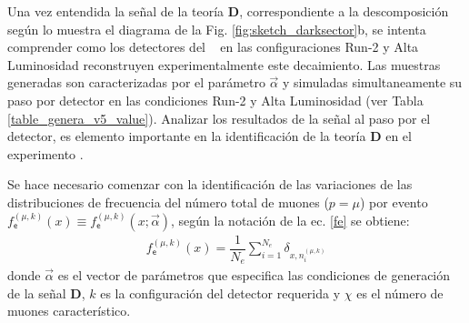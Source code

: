 
Una vez entendida la señal de la teoría \MSSM\textbf{D}, correspondiente a la descomposición según lo muestra el diagrama de la Fig. \ref{fig:sketch_darksector}b, se intenta comprender como los detectores del \CMS ~ en las configuraciones Run-2 y Alta Luminosidad reconstruyen experimentalmente este decaimiento. Las muestras generadas son caracterizadas por el parámetro $\vec{\alpha}$ y simuladas simultaneamente su paso por detector en las condiciones Run-2 y Alta Luminosidad (ver Tabla \ref{table_genera_v5_value}). Analizar los resultados de la señal al paso por el detector, es elemento importante en la identificación de la teoría \MSSM\textbf{D} en el experimento \CMS.


Se hace necesario comenzar con la identificación de las variaciones de las distribuciones de frecuencia del número total de muones ($p=\mu$) por evento $f^{(\mu, k)}_\textsf{e} (x) \equiv f^{(\mu, k)}_\textsf{e} (x; \vec{\alpha})$, según la notación de la ec. \ref{fe} se obtiene:
\begin{eqnarray}
f^{(\mu, k)}_\textsf{e} (x) = \dfrac{1}{N_e}\sum_{i=1}^{N_e} \delta_{x, n_i^{(\mu,k)}}
\end{eqnarray}
donde $\vec{\alpha}$ es el vector de parámetros que especifica las condiciones de generación de la señal \MSSM\textbf{D}, $k$ es la configuración del detector requerida y $\chi$ es el número de muones característico.

